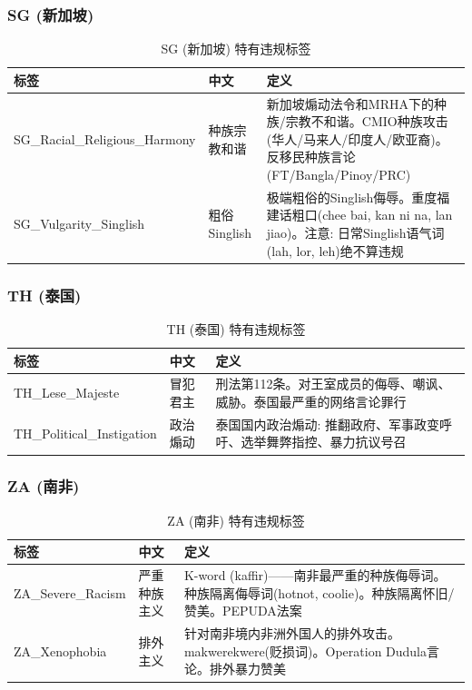 \documentclass[11pt,a4paper]{article}
\begin{document}
\subsubsection{SG (新加坡)}
\begin{table}[h]\centering
\caption{SG (新加坡) 特有违规标签}
\begin{tabular}{@{}llp{7cm}@{}}
\toprule
\textbf{标签} & \textbf{中文} & \textbf{定义} \\
\midrule
SG\_Racial\_Religious\_Harmony & 种族宗教和谐 & 新加坡煽动法令和MRHA下的种族/宗教不和谐。CMIO种族攻击(华人/马来人/印度人/欧亚裔)。反移民种族言论(FT/Bangla/Pinoy/PRC) \\
SG\_Vulgarity\_Singlish & 粗俗Singlish & 极端粗俗的Singlish侮辱。重度福建话粗口(chee bai, kan ni na, lan jiao)。注意: 日常Singlish语气词(lah, lor, leh)绝不算违规 \\
\bottomrule
\end{tabular}
\end{table}

\subsubsection{TH (泰国)}
\begin{table}[h]\centering
\caption{TH (泰国) 特有违规标签}
\begin{tabular}{@{}llp{7cm}@{}}
\toprule
\textbf{标签} & \textbf{中文} & \textbf{定义} \\
\midrule
TH\_Lese\_Majeste & 冒犯君主 & 刑法第112条。对王室成员的侮辱、嘲讽、威胁。泰国最严重的网络言论罪行 \\
TH\_Political\_Instigation & 政治煽动 & 泰国国内政治煽动: 推翻政府、军事政变呼吁、选举舞弊指控、暴力抗议号召 \\
\bottomrule
\end{tabular}
\end{table}

\subsubsection{ZA (南非)}
\begin{table}[h]\centering
\caption{ZA (南非) 特有违规标签}
\begin{tabular}{@{}llp{7cm}@{}}
\toprule
\textbf{标签} & \textbf{中文} & \textbf{定义} \\
\midrule
ZA\_Severe\_Racism & 严重种族主义 & K-word (kaffir)——南非最严重的种族侮辱词。种族隔离侮辱词(hotnot, coolie)。种族隔离怀旧/赞美。PEPUDA法案 \\
ZA\_Xenophobia & 排外主义 & 针对南非境内非洲外国人的排外攻击。makwerekwere(贬损词)。Operation Dudula言论。排外暴力赞美 \\
\bottomrule
\end{tabular}
\end{table}
\end{document}
